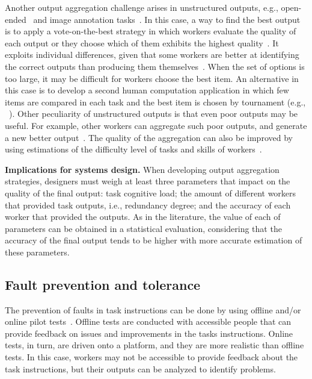 \documentclass[11pt]{bmc_article_s50}
\begin{document}
Another output aggregation challenge arises in unstructured outputs, e.g., open-ended~\cite{Bernstein:2010,Sun:Hcomp:2011} {\color{black}and image annotation tasks~\cite{Salek:2013}}. In this case, a way to find the best output is to apply a vote-on-the-best strategy in which workers evaluate the quality of each output or they choose which of them exhibits the highest quality~\cite{Kulkarni2011b}. It exploits individual differences, given that some workers are better at identifying the correct outputs than producing them themselves~\cite{Sun:Hcomp:2011}. When the set of options is too large, it may be difficult for workers choose the best item. An alternative in this case is to develop a second human computation application in which few items are compared in each task and the best item is chosen by tournament (e.g., ~\cite{Sun:Hcomp:2011,Venetis:2012}). Other peculiarity of unstructured outputs is that even poor outputs may be useful. For example, other workers can aggregate such poor outputs, and generate a new better output~\cite{Kulkarni2012}. {\color{black}The quality of the aggregation can also be improved by using estimations of the difficulty level of tasks and skills of workers~\cite{Salek:2013}.}

\textbf{Implications for systems design.} When developing output aggregation strategies, designers must weigh at least three parameters that impact on the quality of the final output:  task cognitive load;  the amount of different workers that provided task outputs, i.e., redundancy degree; and  the accuracy of each worker that provided the outputs. As in the literature, the value of each of parameters can be obtained in a statistical evaluation, considering that the accuracy of the final output tends to be higher with more accurate estimation of these parameters.

\subsection{Fault prevention and tolerance}

The prevention of faults in task instructions can be done by using offline and/or online pilot tests~\cite{Chen:chiHcomp:2011}. Offline tests are conducted with accessible people that can provide feedback on issues and improvements in the tasks instructions. Online tests, in turn, are driven onto a platform, and they are more realistic than offline tests. In this case, workers may not be accessible to provide feedback about the task instructions, but their outputs can be analyzed to identify problems.
\end{document}
